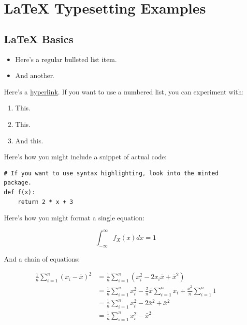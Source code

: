 \section{\LaTeX{} Typesetting Examples}

\subsection{\LaTeX{} Basics}


\begin{itemize}
    \item Here's a regular bulleted list item.
    \item And another.
\end{itemize}

Here's a \href{https://datascience.ucsd.edu}{hyperlink}. If you want to use a numbered list, you can experiment with:

\begin{enumerate}
    \item This.
    \item This.
    \item And this.
\end{enumerate}

Here's how you might include a snippet of actual code:

\begin{verbatim}
# If you want to use syntax highlighting, look into the minted package.
def f(x):
    return 2 * x + 3
\end{verbatim}

Here's how you might format a single equation:

$$\int_{-\infty}^\infty f_X(x)dx = 1$$

And a chain of equations:

\begin{align*}
    \frac{1}{n}\sum_{i = 1}^n (x_i - \bar{x})^2 &= \frac{1}{n}\sum_{i = 1}^n (x_i^2 - 2x_i\bar{x} + \bar{x}^2)
    \\ &= \frac{1}{n}\sum_{i = 1}^n x_i^2 - \frac{2}{n}\bar{x}\sum_{i = 1}^n x_i + \frac{\bar{x}^2}{n}\sum_{i = 1}^n 1
    \\ &= \frac{1}{n}\sum_{i = 1}^n x_i^2 - 2\bar{x}^2 + \bar{x}^2
    \\ &= \frac{1}{n}\sum_{i = 1}^n x_i^2 - \bar{x}^2
\end{align*}


